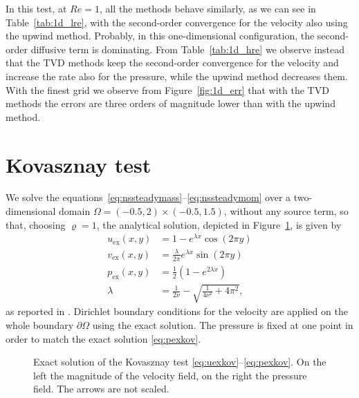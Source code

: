 In this test, at $Re=1$, all the methods behave similarly, as we 
can see in Table~\ref{tab:1d_lre}, with the second-order convergence for the 
velocity also using the upwind method. Probably, in this one-dimensional 
configuration, the second-order diffusive term is dominating. From 
Table~\ref{tab:1d_hre} we observe instead that the TVD methods keep the second-order 
convergence for the velocity and increase the rate also for the pressure, while 
the upwind method decreases them. With the finest grid we observe from 
Figure~\ref{fig:1d_err} that with the TVD methods the errors are three orders of 
magnitude lower than with the upwind method.

%
\section{Kovasznay test}
We solve the equations~\eqref{eq:nssteadymass}--\eqref{eq:nssteadymom} over a 
two-dimensional domain $\Omega=(-0.5, 2) \times (-0.5,1.5)$, without any source 
term, so that, choosing $\varrho=1$, the analytical solution, depicted in 
Figure~\ref{fig:kovexact}, is given by
\begin{align}
\label{eq:uexkov} u_\text{ex}(x,y) &= 1-e^{\lambda x} \cos (2 \pi y)\\
v_\text{ex}(x,y) &= \frac{\lambda}{2\pi} e^{\lambda x} \sin (2\pi y)\\
\label{eq:pexkov}	p_\text{ex}(x,y) &= \frac{1}{2}(1 -e^{2\lambda x})\\
\lambda &= \frac{1}{2 \nu} - \sqrt{\frac{1}{4 \nu^2} + 4\pi^2},
\end{align}
as reported in \cite{test:kovasznay}.
Dirichlet boundary conditions for the velocity are applied on the whole 
boundary $\partial \Omega$ using the exact solution. The pressure is fixed at 
one point in order to match the exact solution \eqref{eq:pexkov}.
\begin{figure}
	\centering
	\caption[Exact solution of the Kovasznay test]{Exact solution of the 
	Kovasznay test \eqref{eq:uexkov}--\eqref{eq:pexkov}. On the left the 
	magnitude of the velocity field, on the 
	right the pressure field. The arrows are not scaled.}
	\label{fig:kovexact}
\end{figure}

